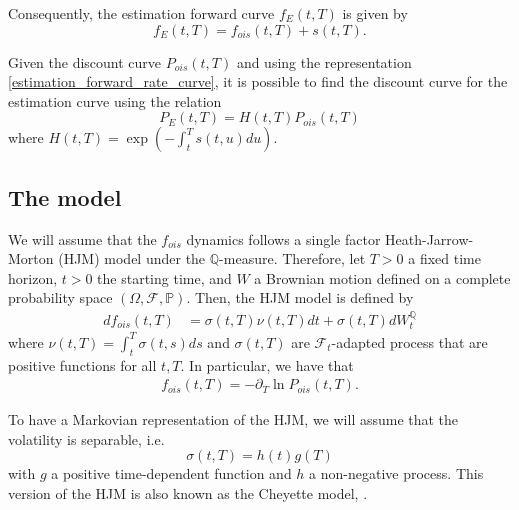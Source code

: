 \documentclass[a4paper,10pt]{article}
\newcommand{\1}{\mathbf{1}}
\begin{document}
Consequently, the estimation forward curve $f_{E}(t, T)$ is given by
\begin{equation}\label{estimation_forward_rate_curve}
f_{E}(t,T) = f_{ois}(t,T) + s(t,T).
\end{equation}

Given the discount curve $P_{ois}(t,T)$ and using the representation \eqref{estimation_forward_rate_curve}, it is possible to find the discount curve for the estimation curve using the relation
\begin{equation}\label{bond_forward}
P_{E}(t,T)=H(t,T)P_{ois}(t,T)
\end{equation}
where $H(t,T)=\exp\left(-\int_{t}^{T}s(t,u) du \right)$.

\subsection{The model}
We will assume that the $f_{ois}$ dynamics follows a single factor Heath-Jarrow-Morton (HJM) model under the $\mathbb{Q}$-measure. Therefore, let $T>0$ a fixed time horizon, $t>0$ the starting time, and $W$ a Brownian motion defined on a complete probability space $(\Omega, \mathcal{F}, \mathbb{P})$. Then, the HJM model is defined by
\begin{align}\label{ois_forward_rate_curve}
df_{ois}(t,T) &= \sigma(t,T)\nu(t,T)dt + \sigma(t,T)dW^{\mathbb{Q}}_t
\end{align}
where $\nu(t,T)=\int_{t}^{T}\sigma(t,s)ds$ and $\sigma(t, T)$ are $\mathcal{F}_{t}$-adapted process that are positive functions for all $t,T$. In particular, we have that
\begin{eqnarray*}
f_{ois}(t,T)= -\partial_{T}\ln P_{ois}(t,T).
\end{eqnarray*}

To have a Markovian representation of the HJM, we will assume that the volatility is separable, i.e.
\begin{equation}\label{separation_condition}
\sigma(t,T)= h(t)g(T)
\end{equation}
with $g$ a positive time-dependent function and $h$ a non-negative process. This version of the HJM is also known as the Cheyette model, \cite{Cheyette}.\\
\end{document}
